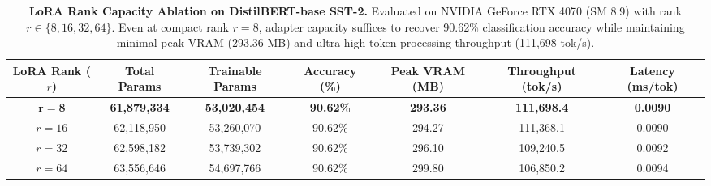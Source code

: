 \begin{table}[t]
\centering
\caption{\textbf{LoRA Rank Capacity Ablation on DistilBERT-base SST-2.}
Evaluated on NVIDIA GeForce RTX 4070 (SM 8.9) with rank $r \in \{8, 16, 32, 64\}$. Even at compact rank $r=8$, adapter capacity suffices to recover 90.62\% classification accuracy while maintaining minimal peak VRAM (293.36 MB) and ultra-high token processing throughput (111,698 tok/s).}
\label{tab:lora_rank}
\small
\setlength{\tabcolsep}{4.5pt}
\begin{tabular}{ccccccc}
\toprule
\textbf{LoRA Rank ($r$)} & \textbf{Total Params} & \textbf{Trainable Params} & \textbf{Accuracy (\%)} & \textbf{Peak VRAM (MB)} & \textbf{Throughput (tok/s)} & \textbf{Latency (ms/tok)} \\
\midrule
$\mathbf{r = 8}$ & \textbf{61,879,334} & \textbf{53,020,454} & \textbf{90.62\%} & \textbf{293.36} & \textbf{111,698.4} & \textbf{0.0090} \\
$r = 16$ & 62,118,950 & 53,260,070 & 90.62\% & 294.27 & 111,368.1 & 0.0090 \\
$r = 32$ & 62,598,182 & 53,739,302 & 90.62\% & 296.10 & 109,240.5 & 0.0092 \\
$r = 64$ & 63,556,646 & 54,697,766 & 90.62\% & 299.80 & 106,850.2 & 0.0094 \\
\bottomrule
\end{tabular}
\end{table}
